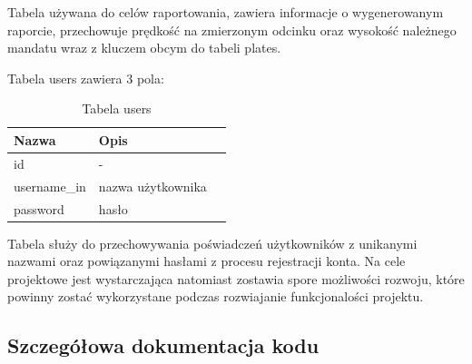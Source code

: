 \documentclass[12pt,a4paper,oneside]{article}
\theoremstyle{definition}
\numberwithin{equation}{section}
\begin{document}
        Tabela używana do celów raportowania, zawiera informacje o wygenerowanym raporcie, przechowuje prędkość na zmierzonym odcinku oraz wysokość należnego mandatu wraz z kluczem obcym do tabeli plates.

    \newpage
    Tabela users zawiera 3 pola:

    \begin{table}[h]
    \centering
    \begin{tabularx}{\textwidth}{|X|X|X|}
    \hline
    \textbf{Nazwa} & \textbf{Opis} \\ \hline
    id &  -   \\ \hline
    username{\_}in & nazwa użytkownika \\  \hline
    password & hasło \\  \hline
    \end{tabularx}
    \caption{Tabela users}
    \end{table}

       Tabela służy do przechowywania poświadczeń użytkowników z unikanymi nazwami oraz powiązanymi hasłami z procesu rejestracji konta. Na cele projektowe jest wystarczająca natomiast zostawia spore możliwości rozwoju, które powinny zostać wykorzystane podczas rozwiajanie funkcjonalości projektu. 




\subsection{Szczegółowa dokumentacja kodu}
\end{document}
